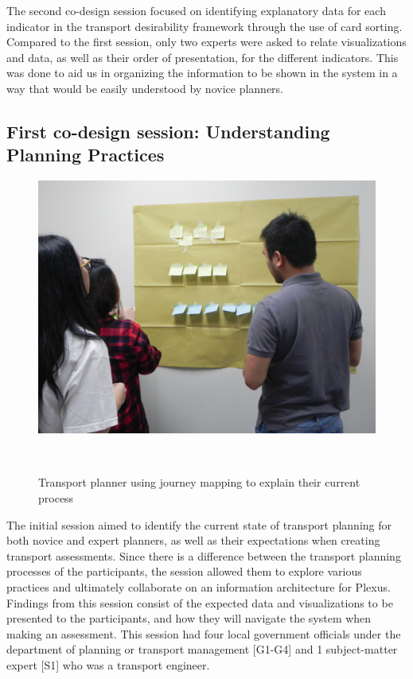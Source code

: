 \documentclass{sigchi}
\begin{document}
The second co-design session focused on identifying explanatory data for each indicator in the transport desirability framework through the use of card sorting. Compared to the first session, only two experts were asked to relate visualizations and data, as well as their order of presentation, for the different indicators. This was done to aid us in organizing the information to be shown in the system in a way that would be easily understood by novice planners.

\subsection{First co-design session: Understanding Planning Practices}

\begin{figure}
\centering
  \includegraphics[width=0.8\columnwidth]{figures/photos/DSCN9673.JPG}
  \caption{Transport planner using journey mapping to explain their current process}~\label{fig:codesign2}
\end{figure}

The initial session aimed to identify the current state of transport planning for both novice and expert planners, as well as their expectations when creating transport assessments. Since there is a difference between the transport planning processes of the participants, the session allowed them to explore various practices and ultimately collaborate on an information architecture for Plexus. Findings from this session consist of the expected data and visualizations to be presented to the participants, and how they will navigate the system when making an assessment. This session had four local government officials under the department of planning or transport management [G1-G4] and 1 subject-matter expert [S1] who was a transport engineer. 
\end{document}
